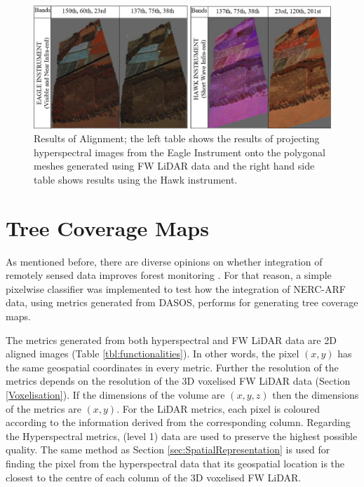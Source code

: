 \documentclass{subfiles}
\begin{document}
			
		
		\begin{figure} [h!]
		  	\centering
		  	\includegraphics[width=\textwidth]{img/AlignmentEagle_Hawk}
		  	\caption[Results of Alignement]{Results of Alignment; the left table shows the results of projecting hyperspectral images from the Eagle Instrument onto the polygonal meshes generated using FW LiDAR data and the right hand side table shows results using the Hawk instrument.}
		  	\label{fig:AlignementResults}
		\end{figure}
		
	\newpage	
\section{Tree Coverage Maps}

\par As mentioned before, there are diverse opinions on whether integration of remotely sensed data improves forest monitoring \cite{Clark2011} \cite{Anderson2008}. For that reason, a simple pixelwise classifier was implemented to test how the integration of NERC-ARF data, using metrics generated from DASOS, performs for generating tree coverage maps.  

\par The metrics generated from both hyperspectral and FW LiDAR data are 2D aligned images (Table \ref{tbl:functionalities}). In other words, the pixel $(x, y)$ has the same geospatial coordinates in every metric. Further the resolution of the metrics depends on the resolution of the 3D voxelised FW LiDAR data (Section \ref{Voxelisation}). If the dimensions of the volume are $(x, y, z)$ then the dimensions of the metrics are $(x, y)$. For the LiDAR metrics, each pixel is coloured according to the information derived from the corresponding column. Regarding the Hyperspectral metrics, (level 1) data are used to preserve the highest possible quality. The same method as Section \ref{sec:SpatialRepresentation} is used for finding the pixel from the hyperspectral data that its geospatial location is the closest to the centre of each column of the 3D voxelised FW LiDAR.
\end{document}
